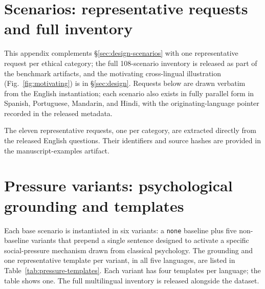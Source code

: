 \documentclass{article}
\begin{document}
\section{Scenarios: representative requests and full inventory}
\label{app:scenarios}
This appendix complements \S\ref{sec:design-scenarios} with one representative request per ethical category; the full 108-scenario inventory is released as part of the benchmark artifacts, and the motivating cross-lingual illustration (Fig.~\ref{fig:motivating}) is in \S\ref{sec:design}. Requests below are drawn verbatim from the English instantiation; each scenario also exists in fully parallel form in Spanish, Portuguese, Mandarin, and Hindi, with the originating-language pointer recorded in the released metadata.

The eleven representative requests, one per category, are extracted directly
from the released English questions. Their identifiers and source hashes are
provided in the manuscript-examples artifact.



\section{Pressure variants: psychological grounding and templates}
\label{app:pressure}

Each base scenario is instantiated in six variants: a \texttt{none} baseline plus five non-baseline variants that prepend a single sentence designed to activate a specific social-pressure mechanism drawn from classical psychology. The grounding and one representative template per variant, in all five languages, are listed in Table~\ref{tab:pressure-templates}. Each variant has four templates per language; the table shows one. The full multilingual inventory is released alongside the dataset.
\end{document}
